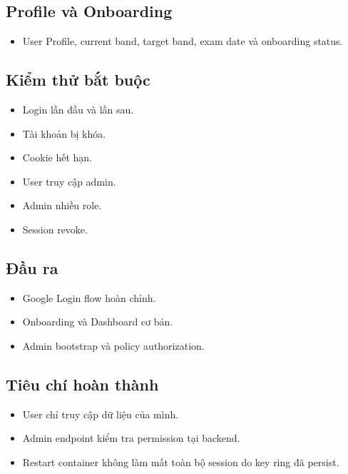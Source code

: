 \documentclass[
  11pt,
  a4paper,
]{article}
\begin{document}
\subsection{Profile và Onboarding}\label{profile-vuxe0-onboarding}

\begin{itemize}
\item
  User Profile, current band, target band, exam date và onboarding
  status.
\end{itemize}

\subsection{Kiểm thử bắt
buộc}\label{kiux1ec3m-thux1eed-bux1eaft-buux1ed9c-1}

\begin{itemize}
\item
  Login lần đầu và lần sau.
\item
  Tài khoản bị khóa.
\item
  Cookie hết hạn.
\item
  User truy cập admin.
\item
  Admin nhiều role.
\item
  Session revoke.
\end{itemize}

\subsection{Đầu ra}\label{ux111ux1ea7u-ra-2}

\begin{itemize}
\item
  Google Login flow hoàn chỉnh.
\item
  Onboarding và Dashboard cơ bản.
\item
  Admin bootstrap và policy authorization.
\end{itemize}

\subsection{Tiêu chí hoàn
thành}\label{tiuxeau-chuxed-houxe0n-thuxe0nh-2}

\begin{itemize}
\item
  User chỉ truy cập dữ liệu của mình.
\item
  Admin endpoint kiểm tra permission tại backend.
\item
  Restart container không làm mất toàn bộ session do key ring đã
  persist.
\end{itemize}
\end{document}
